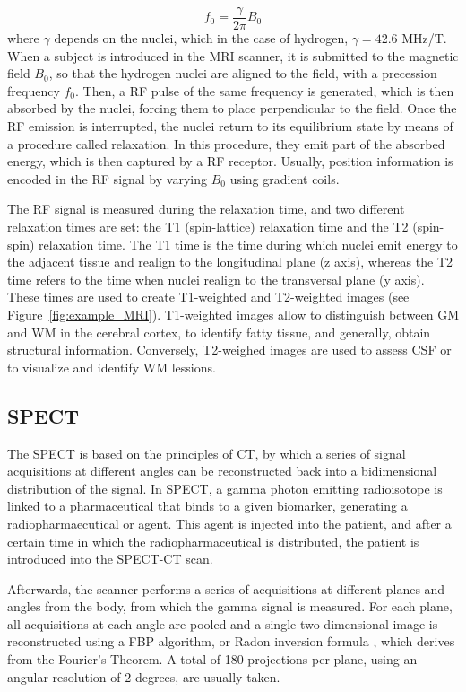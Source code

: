 \begin{equation}\label{eq:lamor}
f_0 = \frac{\gamma}{2\pi } B_0 
\end{equation}
where $\gamma$ depends on the nuclei, which in the case of hydrogen, $\gamma = 42.6$ MHz/T. When a subject is introduced in the \ac{MRI} scanner, it is submitted to the magnetic field $B_0$, so that the hydrogen nuclei are aligned to the field, with a precession frequency $f_0$. Then, a \ac{RF} pulse of the same frequency is generated, which is then absorbed by the nuclei, forcing them to place perpendicular to the field. Once the \ac{RF} emission is interrupted, the nuclei return to its equilibrium state by means of a procedure called relaxation. In this procedure, they emit part of the absorbed energy, which is then captured by a \ac{RF} receptor. Usually, position information is encoded in the \ac{RF} signal by varying $B_0$ using gradient coils. 

The \ac{RF} signal is measured during the relaxation time, and two different relaxation times are set: the T1 (spin-lattice) relaxation time and the T2 (spin-spin) relaxation time. The T1 time is the time during which nuclei emit energy to the adjacent tissue and realign to the longitudinal plane (z axis), whereas the T2 time refers to the time when nuclei realign to the transversal plane (y axis). These times are used to create T1-weighted and T2-weighted images (see Figure~\ref{fig:example_MRI}). T1-weighted images allow to distinguish between \ac{GM} and \ac{WM} in the cerebral cortex, to identify fatty tissue, and generally, obtain structural information. Conversely, T2-weighed images are used to assess \ac{CSF} or to visualize and identify \ac{WM} lessions. 

\subsection{\acf{SPECT}}
The \acf{SPECT} is based on the principles of \ac{CT}, by which a series of signal acquisitions at different angles can be reconstructed back into a bidimensional distribution of the signal. In \ac{SPECT}, a gamma photon emitting radioisotope is linked to a pharmaceutical that binds to a given biomarker, generating a radiopharmaecutical or agent. This agent is injected into the patient, and after a certain time in which the radiopharmaceutical is distributed, the patient is introduced into the \ac{SPECT}-\ac{CT} scan. 

Afterwards, the scanner performs a series of acquisitions at different planes and angles from the body, from which the gamma signal is measured. For each plane, all acquisitions at each angle are pooled and a single two-dimensional image is reconstructed using a \ac{FBP} algorithm, or Radon inversion formula \cite{Herman2009l}, which derives from the Fourier's Theorem. A total of 180 projections per plane, using an angular resolution of 2 degrees, are usually taken. 

